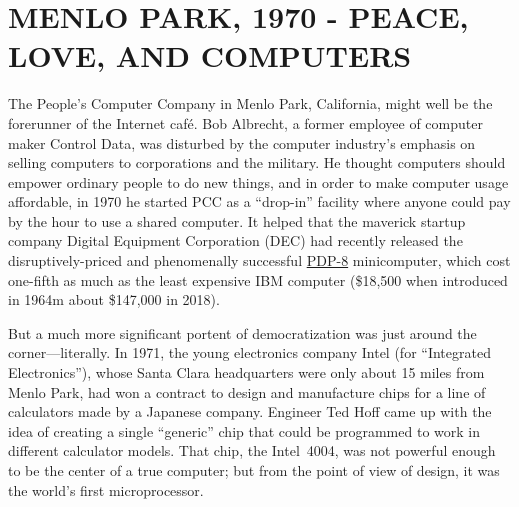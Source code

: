 
\section{MENLO PARK, 1970 - PEACE, LOVE, AND COMPUTERS}



The People's Computer Company in Menlo Park, California, 
might well be the forerunner of the Internet caf\'{e}.
Bob Albrecht, a former employee of computer maker Control Data,
was disturbed by
the computer industry's emphasis on selling computers to corporations and
the military.
He thought computers should empower ordinary people to do new things,
and in order to make computer usage affordable, in
1970 he
started PCC as a ``drop-in'' facility 
where anyone could pay by the hour to use a shared computer.
It helped that the maverick startup company Digital Equipment
Corporation (DEC) had recently released the disruptively-priced and
phenomenally successful
\href{https://www.computerhistory.org/revolution/minicomputers/11/331}{PDP-8}
minicomputer, which cost one-fifth as much as the least expensive IBM
computer (\$18,500 when introduced in 1964m about \$147,000 in 2018).


But a much more significant portent of democratization was just around
the corner---literally.
In 1971, the young electronics company Intel (for ``Integrated
Electronics''), whose Santa Clara headquarters were only about 15
miles from Menlo Park, had won a contract to design and manufacture chips for
a line of calculators made by a Japanese company.
Engineer Ted Hoff came up with the idea of creating a single
``generic'' chip that could be programmed to work in different
calculator models.
That chip, the Intel~4004, was not powerful enough to be the center of
a true computer; but from the point of view of design, it was the
world's first microprocessor.

